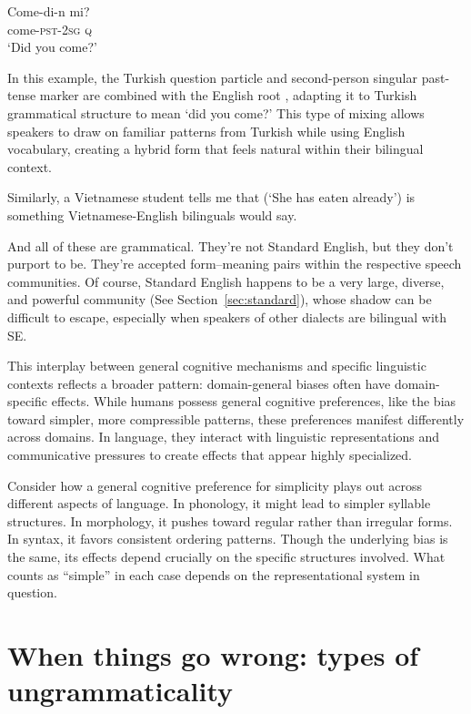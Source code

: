 \ea \gll Come-di-n mi?\\
come-\textsc{pst}-\textsc{2sg} \textsc{q}\\
\glt `Did you come?'
\z

In this example, the Turkish question particle  and second-person singular past-tense marker  are combined with the English root , adapting it to Turkish grammatical structure to mean `did you come?' This type of mixing allows speakers to draw on familiar patterns from Turkish while using English vocabulary, creating a hybrid form that feels natural within their bilingual context.

Similarly, a Vietnamese student tells me that  (`She has eaten already') is something Vietnamese-English bilinguals would say.

And all of these are grammatical. They're not Standard English, but they don't purport to be. They're accepted form--meaning pairs within the respective speech communities. Of course, Standard English happens to be a very large, diverse, and powerful community (See Section~\ref{sec:standard}), whose shadow can be difficult to escape, especially when speakers of other dialects are bilingual with SE.

This interplay between general cognitive mechanisms and specific linguistic contexts reflects a broader pattern: domain-general biases often have domain-specific effects. While humans possess general cognitive preferences, like the bias toward simpler, more compressible patterns, these preferences manifest differently across domains. In language, they interact with linguistic representations and communicative pressures to create effects that appear highly specialized.

Consider how a general cognitive preference for simplicity plays out across different aspects of language. In phonology, it might lead to simpler syllable structures. In morphology, it pushes toward regular rather than irregular forms. In syntax, it favors consistent ordering patterns. Though the underlying bias is the same, its effects depend crucially on the specific structures involved. What counts as ``simple'' in each case depends on the representational system in question.

\section{When things go wrong: types of ungrammaticality}

